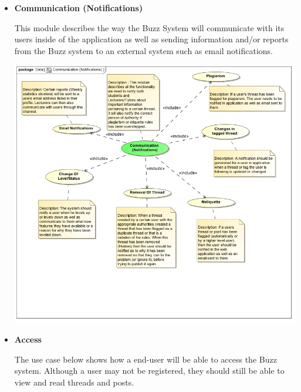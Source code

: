 \documentclass[a4paper,12pt]{report}
\begin{document}
\begin{itemize}
\begin{center}
		\end{center}
\newpage
	\item \textbf{Communication (Notifications)}
		\begin{flushleft}
		This module describes the way the Buzz System will communicate with its users inside of the application as well as sending information and/or reports from the Buzz system to an external system such as email notifications.
		\end{flushleft}
		\begin{center}
		\includegraphics[width=1\textwidth]{../Jason/Communication_(Notifications).jpg}\\[0.4cm]
		\end{center}
	\item \textbf{Access}
		\begin{flushleft}
		The use case below shows how a end-user will be able to access the Buzz system. Although a user may not be registered, they should still be able to view and read threads and posts.
		\end{flushleft}
		\begin{center}

\end{center}
\end{itemize}
\end{document}
